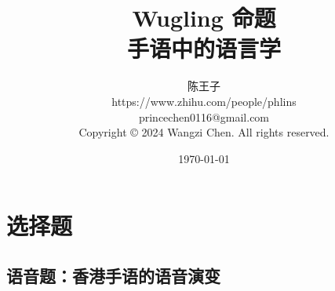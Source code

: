 \documentclass[12pt, a4paper, oneside]{ctexart}
\title{\textbf{Wugling 命题\\手语中的语言学}}
\author{陈王子\\https://www.zhihu.com/people/phlins\\princechen0116@gmail.com\\Copyright © 2024 Wangzi Chen. All rights reserved.}
\date{\today}
\begin{document}
\maketitle

\setcounter{page}{0}
\maketitle
\thispagestyle{empty}
\newpage
\tableofcontents
\listoffigures
\newpage

\section{选择题}

\subsection{语音题：香港手语的语音演变}
\end{document}
